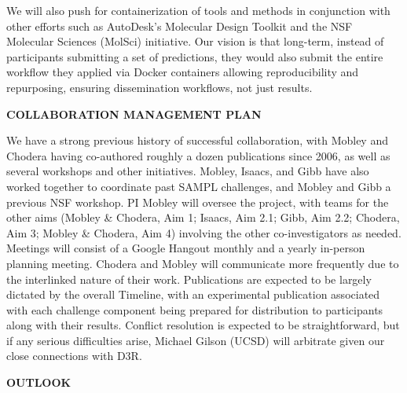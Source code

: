 \documentclass[11pt]{article}
\begin{document}
We will also push for containerization of tools and methods in conjunction with other efforts such as AutoDesk's Molecular Design Toolkit and the NSF Molecular Sciences (MolSci) initiative.
Our vision is that long-term, instead of participants submitting a set of predictions, they would also submit the entire workflow they applied via Docker containers allowing reproducibility and repurposing, ensuring dissemination workflows, not just results.


{\large \bf COLLABORATION MANAGEMENT PLAN} %

We have a strong previous history of successful collaboration, with Mobley and Chodera having co-authored roughly a dozen publications since 2006, as well as several workshops and other initiatives.
Mobley, Isaacs, and Gibb have also worked together to coordinate past SAMPL challenges, and Mobley and Gibb a previous NSF workshop. 
PI Mobley will oversee the project, with teams for the other aims (Mobley \& Chodera, Aim 1; Isaacs, Aim 2.1; Gibb, Aim 2.2; Chodera, Aim 3; Mobley \& Chodera, Aim 4) involving the other co-investigators as needed.
Meetings will consist of a Google Hangout monthly and a yearly in-person planning meeting.
Chodera and Mobley will communicate more frequently due to the interlinked nature of their work.
Publications are expected to be largely dictated by the overall Timeline, with an experimental publication associated with each challenge component being prepared for distribution to participants along with their results.
Conflict resolution is expected to be straightforward, but if any serious difficulties arise, Michael Gilson (UCSD) will arbitrate given our close connections with D3R.

{\large \bf OUTLOOK} %
\end{document}
